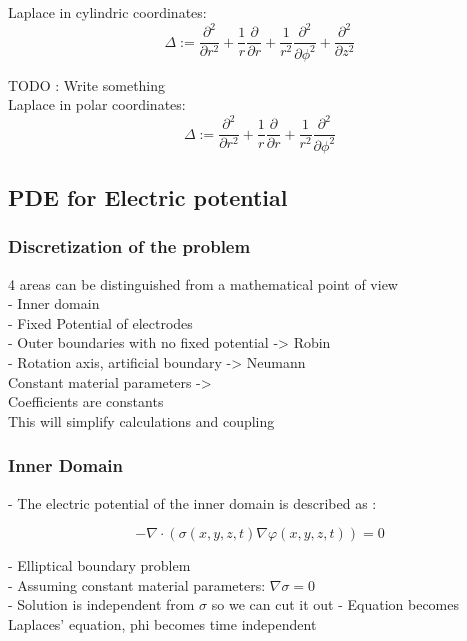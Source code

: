 \documentclass[parskip=half, titlepage=yes, 12pt, BCOR=12mm, DIV=calc]{scrartcl}
\begin{document}
Laplace in cylindric coordinates:
\begin{equation}
    \Delta := \frac{\partial^2}{\partial r^2} + \frac{1}{r} \frac{\partial}{\partial r} + \frac{1}{r^2} \frac{\partial^2}{\partial \phi^2} + \frac{\partial^2}{\partial z^2}
\end{equation}

TODO : Write something \\

Laplace in polar coordinates:
\begin{equation}
    \Delta := \frac{\partial^2}{\partial r^2} + \frac{1}{r} \frac{\partial}{\partial r} + \frac{1}{r^2} \frac{\partial^2}{\partial \phi^2}
\end{equation}



\subsection{PDE for Electric potential}

\subsubsection{Discretization of the problem}
4 areas can be distinguished from a mathematical point of view \\
- Inner domain \\
- Fixed Potential of electrodes \\
- Outer boundaries with no fixed potential -> Robin \\
- Rotation axis, artificial boundary -> Neumann \\

Constant material parameters -> \\
Coefficients are constants \\
This will simplify calculations and coupling \\

\subsubsection{Inner Domain}

- The electric potential of the inner domain is described as : 

\begin{equation}
    - \nabla \cdot (\sigma(x,y,z,t) \nabla \varphi(x,y,z,t)) = 0
\end{equation}

- Elliptical boundary problem \\
- Assuming constant material parameters: $\nabla \sigma = 0$ \\
- Solution is independent from $\sigma$ so we can cut it out
- Equation becomes Laplaces' equation, phi becomes time independent \\
\end{document}
